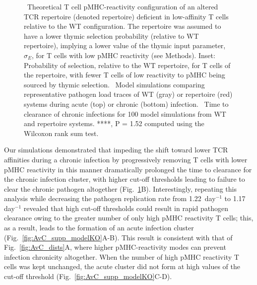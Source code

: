 \begin{figure}[tb]
{    %
    ~Theoretical T cell pMHC-reactivity configuration of an altered TCR repertoire (denoted \dTCR{} repertoire) deficient in low-affinity T cells relative to the WT configuration. The \dTCR{} repertoire was assumed to have a lower thymic selection probability (relative to WT repertoire), implying a lower value of the thymic input parameter, $\sigma_E$, for T cells with low pMHC reactivity (see Methods). Inset: Probability of selection, relative to the WT repertoire, for T cells of the \dTCR{} repertoire, with fewer T cells of low reactivity to pMHC being sourced by thymic selection. %
    ~Model simulations comparing representative pathogen load traces of WT (gray) or \dTCR{} repertoire (red) systems during acute (top) or chronic (bottom) infection. %
    ~Time to clearance of chronic infections for 100 model simulations from WT and \dTCR{} repertoire systems. ****, P = 1.52 computed using the Wilcoxon rank sum test.}
    \label{fig:AvC_modelKO}
\end{figure}
%
Our simulations demonstrated that impeding the shift toward lower TCR affinities during a chronic infection by progressively removing T cells with lower pMHC reactivity in this manner dramatically prolonged the time to clearance for the chronic infection cluster, with higher cut-off thresholds leading to failure to clear the chronic pathogen altogether (Fig.~\ref{fig:AvC_modelKO}B). Interestingly, repeating this analysis while decreasing the pathogen replication rate from 1.22~day$^{-1}$ to 1.17 day$^{-1}$ revealed that high cut-off thresholds could result in rapid pathogen clearance owing to the greater number of only high pMHC reactivity T cells; this, as a result, leads to the formation of an acute infection cluster (Fig.~\ref{fig:AvC_supp_modelKO}A-B). This result is consistent with that of Fig.~\ref{fig:AvC_dists}A, where higher pMHC-reactivity modes can prevent infection chronicity altogether. When the number of high pMHC reactivity T cells was kept unchanged, the acute cluster did not form at high values of the cut-off threshold (Fig.~\ref{fig:AvC_supp_modelKO}C-D).

